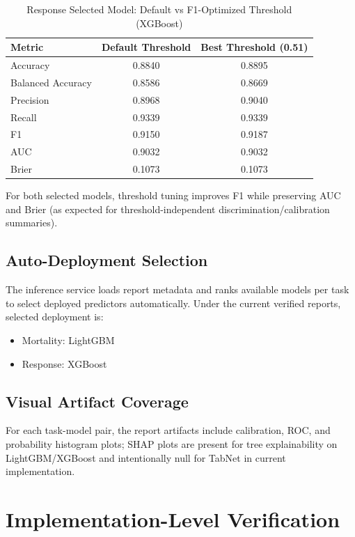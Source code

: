 \documentclass[journal]{IEEEtran}
\begin{document}
\begin{table}[htbp]
\caption{Response Selected Model: Default vs F1-Optimized Threshold (XGBoost)}
\label{tab:response_selected_threshold}
\centering
\small
\begin{tabular}{lcc}
\toprule
Metric & Default Threshold & Best Threshold (0.51) \\
\midrule
Accuracy & 0.8840 & 0.8895 \\
Balanced Accuracy & 0.8586 & 0.8669 \\
Precision & 0.8968 & 0.9040 \\
Recall & 0.9339 & 0.9339 \\
F1 & 0.9150 & 0.9187 \\
AUC & 0.9032 & 0.9032 \\
Brier & 0.1073 & 0.1073 \\
\bottomrule
\end{tabular}
\end{table}

For both selected models, threshold tuning improves F1 while preserving AUC and Brier (as expected for threshold-independent discrimination/calibration summaries).

\subsection{Auto-Deployment Selection}
The inference service loads report metadata and ranks available models per task to select deployed predictors automatically. Under the current verified reports, selected deployment is:
\begin{itemize}
    \item Mortality: LightGBM
    \item Response: XGBoost
\end{itemize}

\subsection{Visual Artifact Coverage}
For each task-model pair, the report artifacts include calibration, ROC, and probability histogram plots; SHAP plots are present for tree explainability on LightGBM/XGBoost and intentionally null for TabNet in current implementation.

\section{Implementation-Level Verification}
\end{document}
